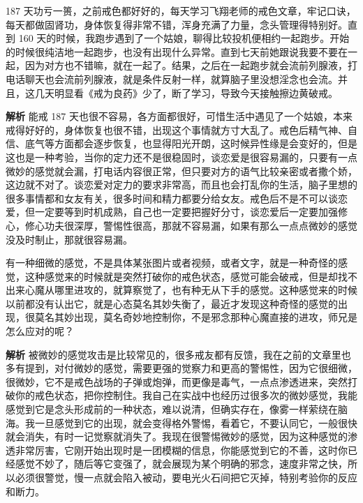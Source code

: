 \begin{case}
    187 天功亏一篑，之前戒色都好好的，每天学习飞翔老师的戒色文章，牢记口诀，每天都做固肾功，身体恢复得非常不错，浑身充满了力量，念头管理得特别好。直到 160 天的时候，我跑步遇到了一个姑娘，聊得比较投机便相约一起跑步。开始的时候很纯洁地一起跑步，也没有出现什么异常。直到七天前她跟说我要不要在一起，因为对方也不错嘛，就在一起了。结果，之后在一起跑步就会流前列腺液，打电话聊天也会流前列腺液，就是条件反射一样，就算脑子里没想淫念也会流。并且，这几天明显看《戒为良药》少了，断了学习，导致今天接触擦边黄破戒。

    \textbf{解析} 能戒 187 天也很不容易，各方面都很好，可惜生活中遇见了一个姑娘，本来戒得好好的，身体恢复也很不错，出现这个事情就方寸大乱了。戒色后精气神、自信、底气等方面都会逐步恢复，也显得阳光开朗，这时候异性缘是会变好的，但是这也是一种考验，当你的定力还不是很稳固时，谈恋爱是很容易漏的，只要有一点微妙的感觉就会漏，打电话内容很正常，但只要对方的语气比较亲密或者撒个娇，这边就不对了。谈恋爱对定力的要求非常高，而且也会打乱你的生活，脑子里想的很多事情都和女友有关，很多时间和精力都要分给女友。戒色后不是不可以谈恋爱，但一定要等到时机成熟，自己也一定要把握好分寸，谈恋爱后一定要加强修心，修心功夫很深厚，警惕性很高，那就不容易漏，如果有那么一点点微妙的感觉没及时制止，那就很容易漏。
\end{case}

\begin{case}[稳住你的戒色状态]
    有一种细微的感觉，不是具体某张图片或者视频，或者文字，就是一种奇怪的感觉，这种感觉来的时候就是突然打破你的戒色状态，感觉可能会破戒，但是却找不出来心魔从哪里进攻的，就算察觉了，也有种无从下手的感觉。这种感觉来的时候以前都没有认出它，就是心态莫名其妙失衡了，最近才发现这种奇怪的感觉的出现，很莫名其妙出现，莫名奇妙地控制你，不是邪念那种心魔直接的进攻，师兄是怎么应对的呢？

    \textbf{解析} 被微妙的感觉攻击是比较常见的，很多戒友都有反馈，我在之前的文章里也多有提到，对付微妙的感觉，需要更强的觉察力和更高的警惕性，因为它很细微，很微妙，它不是戒色战场的子弹或炮弹，而更像是毒气，一点点渗透进来，突然打破你的戒色状态，把你控制住。我自己在实战中也经历过很多次的微妙感觉，我能感觉到它是念头形成前的一种状态，难以说清，但确实存在，像雾一样萦绕在脑海。我一旦感觉到它的出现，就会变得格外警惕，看着它，不要认同它，一般很快就会消失，有时一记觉察就消失了。我现在很警惕微妙的感觉，因为这种感觉的渗透非常厉害，它刚开始出现时是一团模糊的信息，你能感觉到它的不善，这时你已经感觉不妙了，随后等它变强了，就会展现为某个明确的邪念，速度非常之快，所以必须很警觉，慢一点就会陷入被动，要电光火石间把它灭掉，特别考验你的反应和断力。
\end{case}

